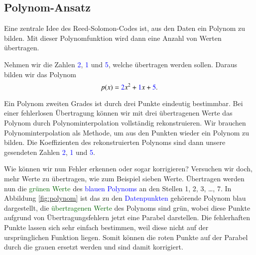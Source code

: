 \subsection{Polynom-Ansatz
\label{reedsolomon:section:polynomansatz}}
Eine zentrale Idee des Reed-Solomon-Codes ist, aus den Daten ein Polynom zu bilden. 
Mit dieser Polynomfunktion wird dann eine Anzahl von Werten übertragen.
\begin{beispiel} Nehmen wir die Zahlen \textcolor{blue}{2}, \textcolor{blue}{1} und \textcolor{blue}{5}, welche übertragen werden sollen. Daraus bilden wir das Polynom
\begin{equation}
p(x)
=
\textcolor{blue}{2}x^2 + \textcolor{blue}{1}x + \textcolor{blue}{5}.
\label{reedsolomon:equation1}
\end{equation}

Ein Polynom zweiten Grades ist durch drei Punkte eindeutig bestimmbar. 
Bei einer fehlerlosen Übertragung können wir mit drei übertragenen Werte
das Polynom durch Polynominterpolation vollständig rekonstruieren.
Wir brauchen Polynominterpolation als Methode, um aus den Punkten wieder ein Polynom zu bilden.
Die Koeffizienten des rekonstruierten Polynoms sind dann unsere gesendeten Zahlen \textcolor{blue}{2}, \textcolor{blue}{1} und \textcolor{blue}{5}.

Wie können wir nun Fehler erkennen oder sogar korrigieren?
Versuchen wir doch, mehr Werte zu übertragen, wie zum Beispiel sieben Werte. 
Übertragen werden nun die \textcolor{darkgreen}{grünen Werte} 
    des \textcolor{blue}{blauen Polynoms} an den Stellen 1, 2, 3, \dots , 7.
In Abbildung \ref{fig:polynom} ist das zu den \textcolor{blue}{Datenpunkten} gehörende Polynom blau dargestellt,
die \textcolor{darkgreen}{übertragenen Werte} des Polynoms sind grün, wobei diese Punkte aufgrund von Übertragungsfehlern jetzt eine Parabel darstellen. 
Die fehlerhaften Punkte lassen sich sehr einfach bestimmen, weil diese nicht auf der ursprünglichen Funktion liegen. 
Somit können die roten Punkte auf der Parabel durch die grauen ersetzt werden und sind damit korrigiert. 


\end{beispiel}
